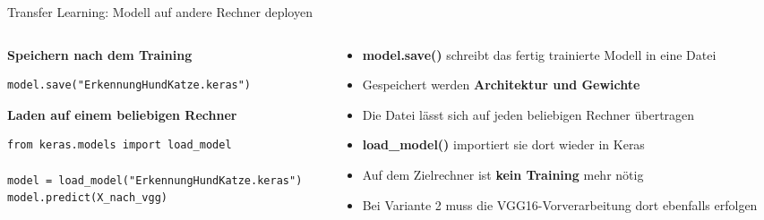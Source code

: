 \begin{frame}[fragile]{Transfer Learning: Modell auf andere Rechner deployen}
\begin{columns}
\begin{column}{0.55\textwidth}
\textbf{Speichern nach dem Training}
\begin{verbatim}
model.save("ErkennungHundKatze.keras")
\end{verbatim}
\vfill
\textbf{Laden auf einem beliebigen Rechner}
\begin{verbatim}
from keras.models import load_model

model = load_model("ErkennungHundKatze.keras")
model.predict(X_nach_vgg)
\end{verbatim}
\end{column}
\begin{column}{0.40\textwidth}
\footnotesize
\begin{itemize}
  \item \textbf{model.save()} schreibt das fertig trainierte Modell in eine Datei
  \item Gespeichert werden \textbf{Architektur und Gewichte}
  \item Die Datei lässt sich auf jeden beliebigen Rechner übertragen
  \item \textbf{load\_model()} importiert sie dort wieder in Keras
  \item Auf dem Zielrechner ist \textbf{kein Training} mehr nötig
  \item Bei Variante 2 muss die VGG16-Vorverarbeitung dort ebenfalls erfolgen
\end{itemize}
\end{column}
\end{columns}
\end{frame}


